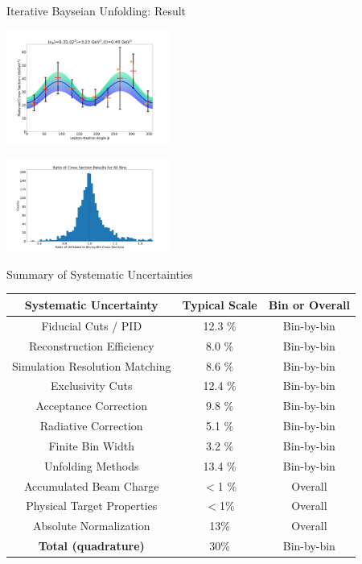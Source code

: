 \documentclass[aspectratio=169]{beamer}
\begin{document}
\begin{frame}{Iterative Bayseian Unfolding: Result}

\includegraphics[width=0.4\textwidth]{defense/sample_prelim_xsec.png}

\includegraphics[width=0.4\textwidth]{Main/ibu/results/binbybin_to_unfolded.png}
\end{frame}

\begin{frame}{Summary of Systematic Uncertainties}
    \begin{table}[H]
        \centering
        \begin{tabular}{|ccc|}
        \hline
        Systematic Uncertainty & Typical Scale & Bin or Overall \\ 
        \hline
            Fiducial Cuts / PID              & 12.3 \%    & Bin-by-bin   \\ 
        \hline
            Reconstruction Efficiency       & 8.0 \%       & Bin-by-bin   \\ 
        \hline
            Simulation Resolution Matching    & 8.6 \%       & Bin-by-bin   \\ 
        \hline
            Exclusivity Cuts            & 12.4 \%      & Bin-by-bin   \\ 
        \hline
            Acceptance Correction       & 9.8 \%       & Bin-by-bin   \\ 
        \hline
            Radiative Correction        & 5.1 \%       & Bin-by-bin   \\ 
        \hline
            Finite Bin Width            & 3.2 \%       & Bin-by-bin   \\
        \hline
            Unfolding Methods            & 13.4 \%       & Bin-by-bin   \\ 
        \hline
            Accumulated Beam Charge     & $<$1 \%        & Overall      \\ 
        \hline
            Physical Target Properties  & $<$1\%    & Overall      \\
        \hline
            Absolute Normalization      & 13\%       & Overall      \\ 
            \hline
            \textbf{Total (quadrature)}          & 30\%     & Bin-by-bin      \\ 
                \hline
        \end{tabular}
    \end{table}

\end{frame}
\end{document}
